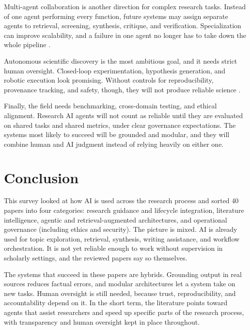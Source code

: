 \documentclass[sn-basic,Numbered]{sn-jnl}
\begin{document}
Multi-agent collaboration is another direction for complex research
tasks. Instead of one agent performing every function, future systems
may assign separate agents to retrieval, screening, synthesis, critique,
and verification. Specialization can improve scalability, and a failure
in one agent no longer has to take down the whole pipeline
\cite{apuri2026maws,singh2024agenticworkflows}.

Autonomous scientific discovery is the most ambitious goal, and it
needs strict human oversight. Closed-loop experimentation, hypothesis
generation, and robotic execution look promising. Without controls for
reproducibility, provenance tracking, and safety, though, they will not
produce reliable science \cite{kohli2025autonomous}.

Finally, the field needs benchmarking, cross-domain testing, and ethical
alignment. Research AI agents will not count as reliable until they are
evaluated on shared tasks and shared metrics, under clear governance
expectations. The systems most likely to succeed will be grounded and
modular, and they will combine human and AI judgment instead of relying
heavily on either one.

\section{Conclusion}
\label{sec:conclusion}

This survey looked at how AI is used across the research process and
sorted 40 papers into four categories: research guidance and lifecycle
integration, literature intelligence, agentic and retrieval-augmented
architectures, and operational governance (including ethics and
security). The picture is mixed. AI is already used for topic
exploration, retrieval, synthesis, writing assistance, and workflow
orchestration. It is not yet reliable enough to work without supervision
in scholarly settings, and the reviewed papers say so themselves.

The systems that succeed in these papers are hybrids. Grounding output
in real sources reduces factual errors, and modular architectures let a
system take on new tasks. Human oversight is still needed, because
trust, reproducibility, and accountability depend on it. In the short
term, the literature points toward agents that assist researchers and
speed up specific parts of the research process, with transparency and
human oversight kept in place throughout.
\end{document}
